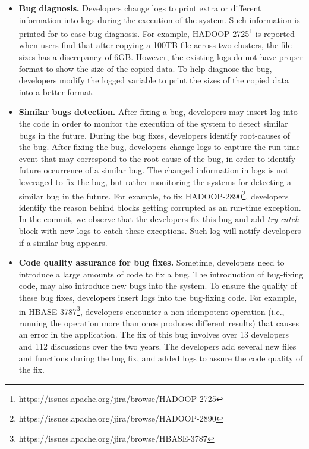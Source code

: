 \begin{itemize}
	

\item \textbf{Bug diagnosis.} Developers change logs to print extra or different information into logs during the execution of the system. Such information is printed for to ease bug diagnosis.
For example, HADOOP-2725\footnote{https://issues.apache.org/jira/browse/HADOOP-2725} is reported when users find that after copying a 100TB file across two clusters, the file sizes has a discrepancy of 6GB. However, the existing logs do not have proper format to show the size of the copied data. To help diagnose the bug, developers modify the logged variable to print the sizes of the copied data into a better format. %


\item \textbf{Similar bugs detection.} After fixing a bug, developers may insert log into the code in order to monitor the execution of the system to detect similar bugs in the future. During the bug fixes, developers identify root-causes of the bug. After fixing the bug, developers change logs to capture the run-time event that may correspond to the root-cause of the bug, in order to identify future occurrence of a similar bug. The changed information in logs is not leveraged to fix the bug, but rather monitoring the systems for detecting a similar bug in the future.
For example, to fix HADOOP-2890\footnote{https://issues.apache.org/jira/browse/HADOOP-2890}, developers identify the reason behind blocks getting corrupted as an run-time exception. In the commit, we observe that the developers fix this bug and add \textsl{try catch} block with new logs to catch these exceptions. Such log will notify developers if a similar bug appears.

\item \textbf{Code quality assurance for bug fixes.} Sometime, developers need to introduce a large amounts of code to fix a bug. The introduction of bug-fixing code, may also introduce new bugs into the system. To ensure the quality of these bug fixes, developers insert logs into the bug-fixing code. For example, in HBASE-3787\footnote{https://issues.apache.org/jira/browse/HBASE-3787}, developers encounter a non-idempotent operation (i.e., running the operation more than once produces different results) that causes an error in the application. The fix of this bug involves over 13 developers and 112 discussions over the two years. The developers add several new files and functions during the bug fix, and added logs to assure the code quality of the fix. 
\end{itemize}
